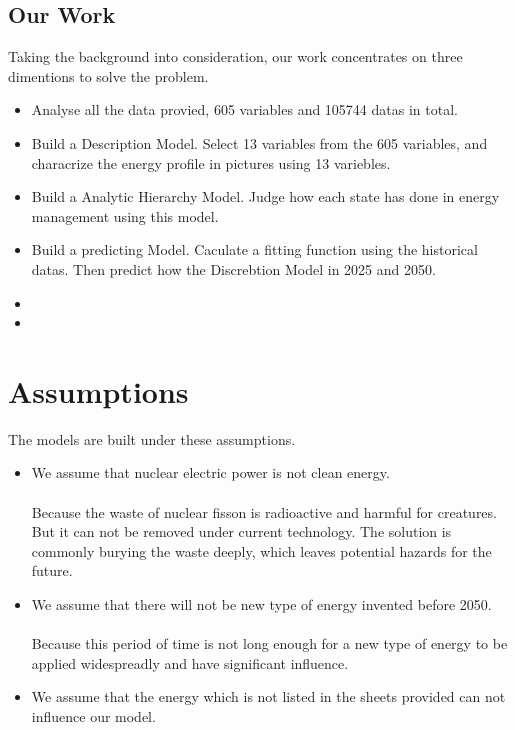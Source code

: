 \documentclass{mcmthesis}
\begin{document}
\subsection{Our Work}
Taking the background into consideration, our work concentrates on  three dimentions to solve the problem.
\begin{itemize}
	\item Analyse all the data provied, 605 variables and 105744 datas in total. 
	\item Build a Description Model. Select 13 variables from the 605 variables, and characrize the energy profile in pictures using 13 variebles. 
	\item Build a Analytic Hierarchy Model. Judge how each state has done in energy management using this model.
	\item Build a predicting Model. Caculate a fitting function using the historical datas. Then predict how the Discrebtion Model in 2025 and 2050.
	\item
	\item
\end{itemize}








%
%
\section{Assumptions}\label{Sec-Assume}
%
The models are built under these assumptions.
\begin{itemize}
	\item We assume that nuclear electric power is not clean energy. \\  \\ Because the waste of nuclear fisson is radioactive and harmful for creatures. But it can not be removed under current technology. The solution is commonly burying the waste deeply, which leaves potential hazards for the future.
	\item We assume that there will not be new type of energy invented before 2050. \\  \\ Because this period of time is not long enough for a new type of energy to be applied widespreadly and have significant influence.
	\item We assume that the energy which is not listed in the sheets provided can not influence our model.
\end{itemize}
\end{document}
